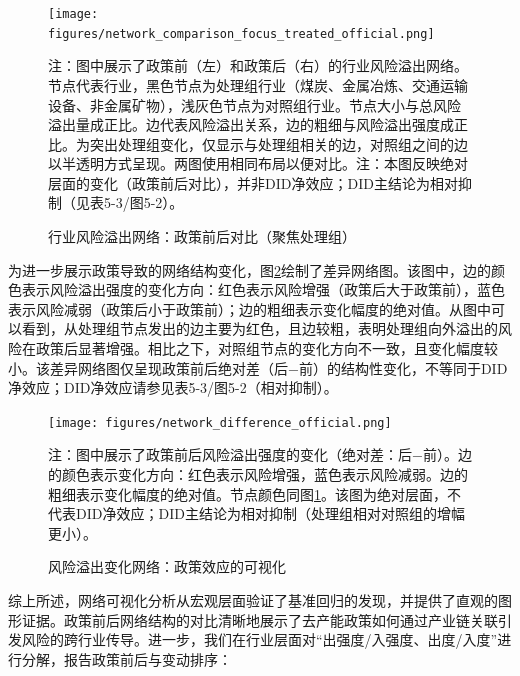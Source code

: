 \begin{figure}[htbp]
\centering
\texttt{[image: figures/network\_comparison\_focus\_treated\_official.png]}
\caption{行业风险溢出网络：政策前后对比（聚焦处理组）}
\label{fig:network_comparison}
\begin{minipage}{0.9\textwidth}
\footnotesize
注：图中展示了政策前（左）和政策后（右）的行业风险溢出网络。节点代表行业，黑色节点为处理组行业（煤炭、金属冶炼、交通运输设备、非金属矿物），浅灰色节点为对照组行业。节点大小与总风险溢出量成正比。边代表风险溢出关系，边的粗细与风险溢出强度成正比。为突出处理组变化，仅显示与处理组相关的边，对照组之间的边以半透明方式呈现。两图使用相同布局以便对比。注：本图反映绝对层面的变化（政策前后对比），并非DID净效应；DID主结论为相对抑制（见表5-3/图5-2）。
\end{minipage}
\end{figure}

为进一步展示政策导致的网络结构变化，图\ref{fig:network_difference}绘制了差异网络图。该图中，边的颜色表示风险溢出强度的变化方向：红色表示风险增强（政策后大于政策前），蓝色表示风险减弱（政策后小于政策前）；边的粗细表示变化幅度的绝对值。从图中可以看到，从处理组节点发出的边主要为红色，且边较粗，表明处理组向外溢出的风险在政策后显著增强。相比之下，对照组节点的变化方向不一致，且变化幅度较小。该差异网络图仅呈现政策前后绝对差（后−前）的结构性变化，不等同于DID净效应；DID净效应请参见表5-3/图5-2（相对抑制）。

\begin{figure}[htbp]
\centering
\texttt{[image: figures/network\_difference\_official.png]}
\caption{风险溢出变化网络：政策效应的可视化}
\label{fig:network_difference}
\begin{minipage}{0.9\textwidth}
\footnotesize
注：图中展示了政策前后风险溢出强度的变化（绝对差：后−前）。边的颜色表示变化方向：红色表示风险增强，蓝色表示风险减弱。边的粗细表示变化幅度的绝对值。节点颜色同图\ref{fig:network_comparison}。该图为绝对层面，不代表DID净效应；DID主结论为相对抑制（处理组相对对照组的增幅更小）。
\end{minipage}
\end{figure}

综上所述，网络可视化分析从宏观层面验证了基准回归的发现，并提供了直观的图形证据。政策前后网络结构的对比清晰地展示了去产能政策如何通过产业链关联引发风险的跨行业传导。进一步，我们在行业层面对“出强度/入强度、出度/入度”进行分解，报告政策前后与变动排序：





